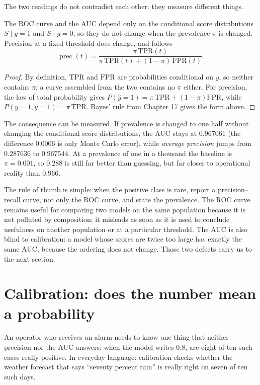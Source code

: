 The two readings do not contradict each other: they measure different things.

\begin{proposisi}
The ROC curve and the AUC depend only on the conditional score distributions $S\mid y=1$ and
$S\mid y=0$, so they do not change when the prevalence $\pi$ is changed. Precision at a fixed
threshold does change, and follows
\[
\operatorname{prec}(t)=\frac{\pi\,\mathrm{TPR}(t)}
{\pi\,\mathrm{TPR}(t)+(1-\pi)\,\mathrm{FPR}(t)} .
\]
\end{proposisi}

\begin{proof}[Proof]
By definition, $\mathrm{TPR}$ and $\mathrm{FPR}$ are probabilities conditional on $y$, so neither
contains $\pi$; a curve assembled from the two contains no $\pi$ either. For precision, the law of
total probability gives $P(\hat y=1)=\pi\,\mathrm{TPR}+(1-\pi)\mathrm{FPR}$, while
$P(y=1,\hat y=1)=\pi\,\mathrm{TPR}$. Bayes' rule from Chapter 17 gives the form above.
\end{proof}

The consequence can be measured. If prevalence is changed to one half without changing the
conditional score distributions, the AUC stays at $0.967061$ (the difference $0.0006$ is only
Monte Carlo error), while \emph{average precision} jumps from $0.287636$ to $0.967544$. At a
prevalence of one in a thousand the baseline is $\pi=0.001$, so $0.288$ is still far better than
guessing, but far closer to operational reality than $0.966$.

The rule of thumb is simple: when the positive class is rare, report a precision--recall curve, not
only the ROC curve, and state the prevalence. The ROC curve remains useful for comparing two models
on the same population because it is not polluted by composition; it misleads as soon as it is used
to conclude usefulness on another population or at a particular threshold. The AUC is also blind to
calibration: a model whose scores are twice too large has exactly the same AUC, because the
ordering does not change. Those two defects carry us to the next section.

\section{Calibration: does the number mean a probability}

An operator who receives an alarm needs to know one thing that neither precision nor the AUC
answers: when the model writes $0.8$, are eight of ten such cases really positive. In everyday
language: calibration checks whether the weather forecast that says ``seventy percent rain'' is
really right on seven of ten such days.

